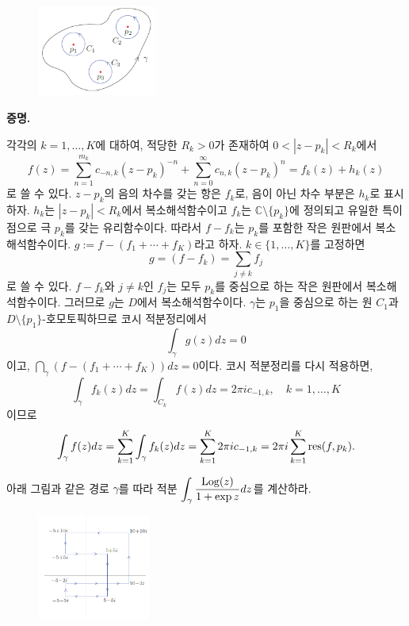 \begin{figure}[h!]
\begin{center}
\includegraphics[width=0.35\textwidth]{./SaltChapter/fig-4-0-10}
\end{center}
\end{figure}

{\bf 증명.}

각각의 $k=1,\ldots, K$에 대하여,
적당한 $R_k>0$가 존재하여 $0<|z-p_k|<R_k$에서
\[
f(z) = \sum_{n=1}^{m_k} c_{-n,k} (z-p_k)^{-n}
+ \sum_{n=0}^\infty c_{n,k} (z-p_k)^n = f_k(z) + h_k(z)
\]
로 쓸 수 있다. $z-p_k$의 음의 차수를 갖는 항은 $f_k$로, 
음이 아닌 차수 부분은 $h_k$로 표시하자.
$h_k$는 $|z-p_k|<R_k$에서 복소해석함수이고
$f_k$는 $\mathbb C\setminus\{p_k\}$에 정의되고
유일한 특이점으로 극 $p_k$를 갖는 유리함수이다.
따라서 $f-f_k$는 $p_k$를 포함한 작은 원판에서 복소해석함수이다.
$g:= f - (f_1+\cdots + f_K)$라고 하자.
$k\in \{1,\ldots, K\}$를 고정하면
\[
g = (f-f_k) = \sum_{j\ne k} f_j
\]
로 쓸 수 있다.
$f-f_k$와 $j\ne k$인 $f_j$는 모두 $p_k$를 중심으로 하는 작은 원판에서
복소해석함수이다. 그러므로 $g$는 $D$에서 복소해석함수이다.
$\gamma$는  $p_1$을 중심으로 하는 원 $C_1$과 $D\setminus\{p_1\}$-호모토픽하므로
코시 적분정리에서
\[
\int_\gamma g(z)dz  = 0
\]
이고, $\dint_\gamma \left( f - (f_1+\cdots + f_K) \right) dz = 0$이다.
코시 적분정리를 다시 적용하면,
\[
\int_\gamma f_k(z)dz = \int_{C_k} f(z)dz = 2\pi i c_{-1,k},
\quad k=1,\ldots, K
\]
이므로
\[
\int_\gamma f(z)dz  = \sum_{k=1}^K \int_\gamma f_k(z)dz
= \sum_{k=1}^K 2\pi i c_{-1,k} = 2\pi i \sum_{k=1}^K \mathop{\mathrm{res}}(f,p_k).
\]

\begin{salt_exercise}\label{ex-4-40}
아래 그림과 같은 경로 $\gamma$를 따라
적분 $\displaystyle\int_\gamma \displaystyle\frac{\mathop{\mathrm{Log}}(z)}{1+\exp z} dz$를 계산하라.
\begin{figure}[h!]
\begin{center}
\includegraphics[width=0.33\textwidth]{./SaltChapter/fig-4-0-11}
\end{center}
\end{figure}
\end{salt_exercise}

